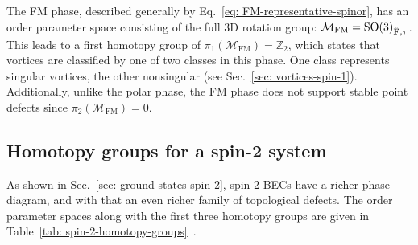 The FM phase, described generally by Eq.~\eqref{eq: FM-representative-spinor},
has an order parameter space consisting of the full 3D rotation group:
\(\mathcal{M}_\text{FM} = {\text{SO}(3)}_{\hat{\vb{F}}, \tau}\).
This leads to a first homotopy group of \(\pi_1(\mathcal{M}_\text{FM})
= {\mathbb{Z}}_2\), which states that vortices are classified by one of two
classes in this phase.
One class represents singular vortices, the other nonsingular (see
Sec.~\ref{sec: vortices-spin-1}).
Additionally, unlike the polar phase, the FM phase does not support stable point
defects since \(\pi_2(\mathcal{M}_\text{FM}) = 0\).

\subsection{Homotopy groups for a spin-2 system}\label{subsec: spin-2-homotopy}
As shown in Sec.~\ref{sec: ground-states-spin-2}, spin-2 BECs have a richer
phase diagram, and with that an even richer family of topological defects.
The order parameter spaces along with the first three homotopy groups are
given in Table~\ref{tab: spin-2-homotopy-groups}~\cite{Mermin1979,Kawaguchi2012,
Kobayashi2012}.
